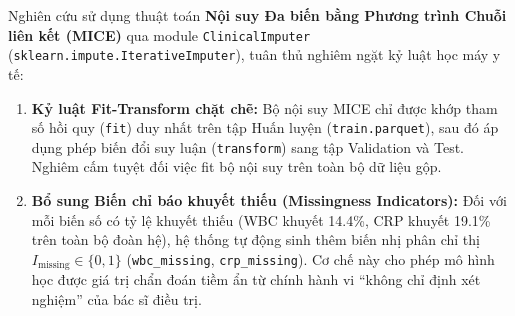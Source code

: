Nghiên cứu sử dụng thuật toán \textbf{Nội suy Đa biến bằng Phương trình Chuỗi liên kết (MICE)} \cite{vanbuuren2011mice} qua module \texttt{ClinicalImputer} (\texttt{sklearn.impute.IterativeImputer}), tuân thủ nghiêm ngặt kỷ luật học máy y tế:
\begin{enumerate}[leftmargin=1.8em, itemsep=0.2em]
    \item \textbf{Kỷ luật Fit-Transform chặt chẽ:} Bộ nội suy MICE chỉ được khớp tham số hồi quy (\texttt{fit}) duy nhất trên tập Huấn luyện (\texttt{train.parquet}), sau đó áp dụng phép biến đổi suy luận (\texttt{transform}) sang tập Validation và Test. Nghiêm cấm tuyệt đối việc fit bộ nội suy trên toàn bộ dữ liệu gộp.
    \item \textbf{Bổ sung Biến chỉ báo khuyết thiếu (Missingness Indicators):} Đối với mỗi biến số có tỷ lệ khuyết thiếu (WBC khuyết 14.4\%, CRP khuyết 19.1\% trên toàn bộ đoàn hệ), hệ thống tự động sinh thêm biến nhị phân chỉ thị $I_{\text{missing}} \in \{0, 1\}$ (\texttt{wbc\_missing}, \texttt{crp\_missing}). Cơ chế này cho phép mô hình học được giá trị chẩn đoán tiềm ẩn từ chính hành vi ``không chỉ định xét nghiệm'' của bác sĩ điều trị.
\end{enumerate}
